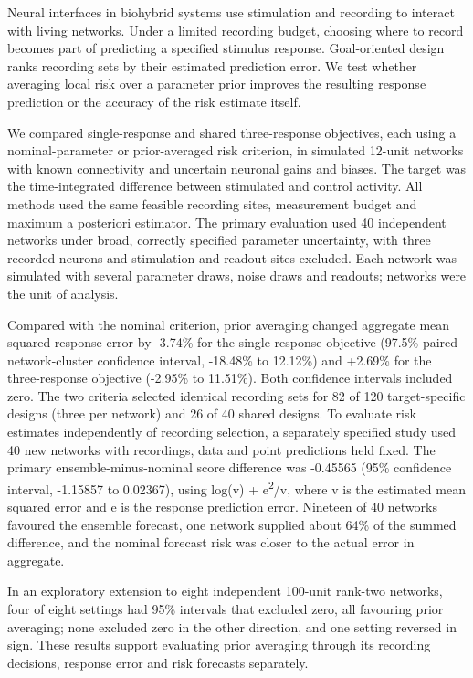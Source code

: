 Neural interfaces in biohybrid systems use stimulation and recording to interact with living networks. Under a limited recording budget, choosing where to record becomes part of predicting a specified stimulus response. Goal-oriented design ranks recording sets by their estimated prediction error. We test whether averaging local risk over a parameter prior improves the resulting response prediction or the accuracy of the risk estimate itself.

We compared single-response and shared three-response objectives, each using a nominal-parameter or prior-averaged risk criterion, in simulated 12-unit networks with known connectivity and uncertain neuronal gains and biases. The target was the time-integrated difference between stimulated and control activity. All methods used the same feasible recording sites, measurement budget and maximum a posteriori estimator. The primary evaluation used 40 independent networks under broad, correctly specified parameter uncertainty, with three recorded neurons and stimulation and readout sites excluded. Each network was simulated with several parameter draws, noise draws and readouts; networks were the unit of analysis.

Compared with the nominal criterion, prior averaging changed aggregate mean squared response error by -3.74\% for the single-response objective (97.5\% paired network-cluster confidence interval, -18.48\% to 12.12\%) and +2.69\% for the three-response objective (-2.95\% to 11.51\%). Both confidence intervals included zero. The two criteria selected identical recording sets for 82 of 120 target-specific designs (three per network) and 26 of 40 shared designs. To evaluate risk estimates independently of recording selection, a separately specified study used 40 new networks with recordings, data and point predictions held fixed. The primary ensemble-minus-nominal score difference was -0.45565 (95\% confidence interval, -1.15857 to 0.02367), using log(v) + e\textsuperscript{2}/v, where v is the estimated mean squared error and e is the response prediction error. Nineteen of 40 networks favoured the ensemble forecast, one network supplied about 64\% of the summed difference, and the nominal forecast risk was closer to the actual error in aggregate.

In an exploratory extension to eight independent 100-unit rank-two networks, four of eight settings had 95\% intervals that excluded zero, all favouring prior averaging; none excluded zero in the other direction, and one setting reversed in sign. These results support evaluating prior averaging through its recording decisions, response error and risk forecasts separately.
